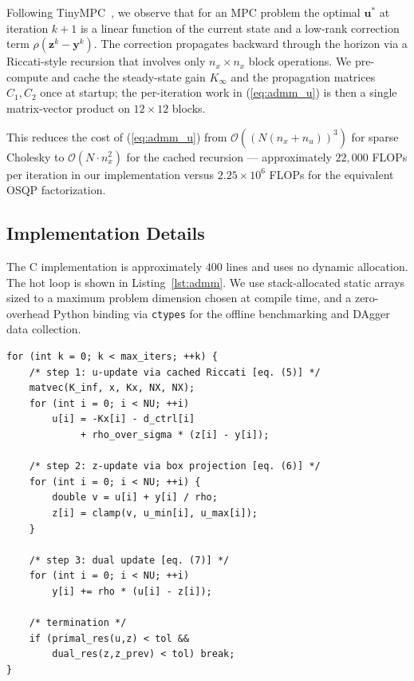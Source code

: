 \documentclass[conference]{IEEEtran}
\begin{document}
Following TinyMPC~\cite{nguyen2024tinympc}, we observe that for an MPC problem the optimal $\bm{u}^*$ at iteration $k+1$ is a linear function of the current state and a low-rank correction term $\rho(\bm{z}^k - \bm{y}^k)$. The correction propagates backward through the horizon via a Riccati-style recursion that involves only $n_x \times n_x$ block operations. We pre-compute and cache the steady-state gain $K_\infty$ and the propagation matrices $C_1, C_2$ once at startup; the per-iteration work in (\ref{eq:admm_u}) is then a single matrix-vector product on $12 \times 12$ blocks.

This reduces the cost of (\ref{eq:admm_u}) from $\mathcal{O}((N(n_x + n_u))^3)$ for sparse Cholesky to $\mathcal{O}(N \cdot n_x^2)$ for the cached recursion --- approximately $22{,}000$ FLOPs per iteration in our implementation versus $2.25 \times 10^6$ FLOPs for the equivalent OSQP factorization.

\subsection{Implementation Details}

The C implementation is approximately $400$ lines and uses no dynamic allocation. The hot loop is shown in Listing~\ref{lst:admm}. We use stack-allocated static arrays sized to a maximum problem dimension chosen at compile time, and a zero-overhead Python binding via \texttt{ctypes} for the offline benchmarking and DAgger data collection.

\begin{lstlisting}[style=ccode, label=lst:admm, float=t, caption={Inner loop of the C ADMM solver. Comments mark the algorithmic correspondence to (\ref{eq:admm_u}) -- (\ref{eq:admm_y}). All arrays are stack-allocated.}]
for (int k = 0; k < max_iters; ++k) {
    /* step 1: u-update via cached Riccati [eq. (5)] */
    matvec(K_inf, x, Kx, NX, NX);
    for (int i = 0; i < NU; ++i)
        u[i] = -Kx[i] - d_ctrl[i]
             + rho_over_sigma * (z[i] - y[i]);

    /* step 2: z-update via box projection [eq. (6)] */
    for (int i = 0; i < NU; ++i) {
        double v = u[i] + y[i] / rho;
        z[i] = clamp(v, u_min[i], u_max[i]);
    }

    /* step 3: dual update [eq. (7)] */
    for (int i = 0; i < NU; ++i)
        y[i] += rho * (u[i] - z[i]);

    /* termination */
    if (primal_res(u,z) < tol &&
        dual_res(z,z_prev) < tol) break;
}
\end{lstlisting}
\end{document}
